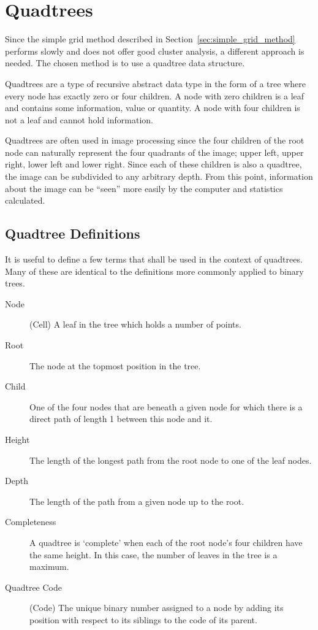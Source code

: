 
\section{Quadtrees}
\label{sec:quadtrees}

Since the simple grid method described in Section~\ref{sec:simple_grid_method}
performs slowly and does not offer good cluster analysis, a different approach
is needed. The chosen method is to use a quadtree data structure.

Quadtrees are a type of recursive abstract data type in the form of a tree
where every node has exactly zero or four children. A node with zero children
is a leaf and contains some information, value or quantity. A node with four
children is not a leaf and cannot hold information.

Quadtrees are often used in image processing since the four children of the
root node can naturally represent the four quadrants of the image; upper left,
upper right, lower left and lower right. Since each of these children is also a
quadtree, the image can be subdivided to any arbitrary depth. From this point,
information about the image can be ``seen'' more easily by the computer and
statistics calculated.

\subsection{Quadtree Definitions}
\label{sub:quadtree_definitions}

It is useful to define a few terms that shall be used in the context of
quadtrees. Many of these are identical to the definitions more commonly applied
to binary trees.

\begin{description}
	\item[Node] (Cell) A leaf in the tree which holds a number of points.
	\item[Root] The node at the topmost position in the tree.
	\item[Child] One of the four nodes that are beneath a given node for which
		there is a direct path of length 1 between this node and it.
	\item[Height] The length of the longest path from the root node to one of
		the leaf nodes.
	\item[Depth] The length of the path from a given node up to the root.
	\item[Completeness] A quadtree is `complete' when each of the root node's
		four children have the same height. In this case, the number of leaves
		in the tree is a maximum.
	\item[Quadtree Code] (Code) The unique binary number assigned to a node by
		adding its position with respect to its siblings to the code of its
		parent.
\end{description}

